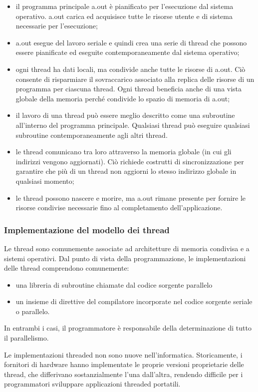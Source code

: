 \begin{itemize}
	\item il programma principale a.out è pianificato per l'esecuzione dal sistema operativo. a.out carica ed acquisisce tutte le risorse utente e di sistema necessarie per l'esecuzione;
	\item a.out esegue del lavoro seriale e quindi crea una serie di thread che possono essere pianificate ed eseguite contemporaneamente dal sistema operativo;
	\item ogni thread ha dati locali, ma condivide anche tutte le risorse di a.out. Ciò consente di risparmiare il sovraccarico associato alla replica delle risorse di un programma per ciascuna thread. Ogni thread beneficia anche di una vista globale della memoria perché condivide lo spazio di memoria di a.out;
	\item il lavoro di una thread può essere meglio descritto come una subroutine all'interno del programma principale. Qualsiasi thread può eseguire qualsiasi subroutine contemporaneamente agli altri thread.
	\item le thread comunicano tra loro attraverso la memoria globale (in cui gli indirizzi vengono aggiornati). Ciò richiede costrutti di sincronizzazione per garantire che più di un thread non aggiorni lo stesso indirizzo globale in qualsiasi momento;
	\item le thread possono nascere e morire, ma a.out rimane presente per fornire le risorse condivise necessarie fino al completamento dell'applicazione.
\end{itemize}

\subsubsection{Implementazione del modello dei thread} Le thread sono comunemente associate ad architetture di memoria condivisa e a sistemi operativi. Dal punto di vista della programmazione, le implementazioni delle thread comprendono comunemente:
\begin{itemize}
	\item una libreria di subroutine chiamate dal codice sorgente parallelo \item un insieme di direttive del compilatore incorporate nel codice sorgente seriale o parallelo.
\end{itemize}
In entrambi i casi, il programmatore è responsabile della determinazione di tutto il parallelismo.

Le implementazioni threaded non sono nuove nell'informatica. Storicamente, i fornitori di hardware hanno implementate le proprie versioni proprietarie delle thread, che differivano sostanzialmente l'una dall'altra, rendendo difficile per i programmatori sviluppare applicazioni threaded portatili.

